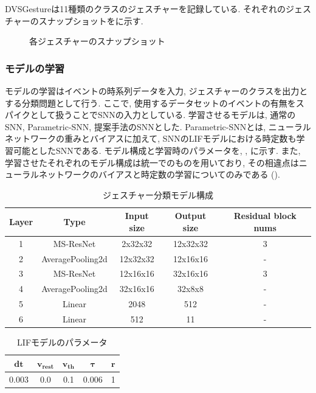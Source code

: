 DVSGestureは11種類のクラスのジェスチャーを記録している.
それぞれのジェスチャーのスナップショットをに示す.
\begin{figure}[htbp]
    \centering
    
    \caption{各ジェスチャーのスナップショット}
    \label{fig:dvs:gesture}
\end{figure}


\subsubsection{モデルの学習}
モデルの学習はイベントの時系列データを入力, ジェスチャーのクラスを出力とする分類問題として行う.
ここで, 使用するデータセットのイベントの有無をスパイクとして扱うことでSNNの入力としている.
学習させるモデルは, 通常のSNN, Parametric-SNN, 提案手法のSNNとした.
Parametric-SNNとは, ニューラルネットワークの重みとバイアスに加えて, SNNのLIFモデルにおける時定数も学習可能としたSNNである.
モデル構成と学習時のパラメータを, , に示す.
また, 学習させたそれぞれのモデル構成は統一でのものを用いており, その相違点はニューラルネットワークのバイアスと時定数の学習についてのみである ().
\begin{table}[htbp]
    \centering
    \caption{ジェスチャー分類モデル構成}
    \label{tab:exp2:model}
    \begin{tabular}{ccccc}
        \hline
        \textbf{Layer}& \textbf{Type}&\textbf{Input size} & \textbf{Output size} & \textbf{Residual block nums}\\
        \hline
        1   & MS-ResNet & 2x32x32 & 12x32x32 & 3\\
        2 & AveragePooling2d & 12x32x32 & 12x16x16 & - \\
        3 & MS-ResNet & 12x16x16 & 32x16x16 & 3\\
        4 & AveragePooling2d & 32x16x16 & 32x8x8 & - \\
        5 & Linear & 2048 & 512 & - \\
        6 & Linear & 512 & 11 & - \\
        \hline
    \end{tabular}
\end{table}

\begin{table}[htbp]
    \centering
    \caption{LIFモデルのパラメータ}
    \label{tab:exp2:model:parameter:lif}
    \begin{tabular}{ccccc}
        \hline
        $\bm{dt}$& $\bm{v_{rest}}$ & $\bm{v_{th}}$ & $\bm{\tau}$ & $\bm{r}$\\
        \hline
        0.003   & 0.0 & 0.1 & 0.006 & 1 \\
        \hline
    \end{tabular}
\end{table}


